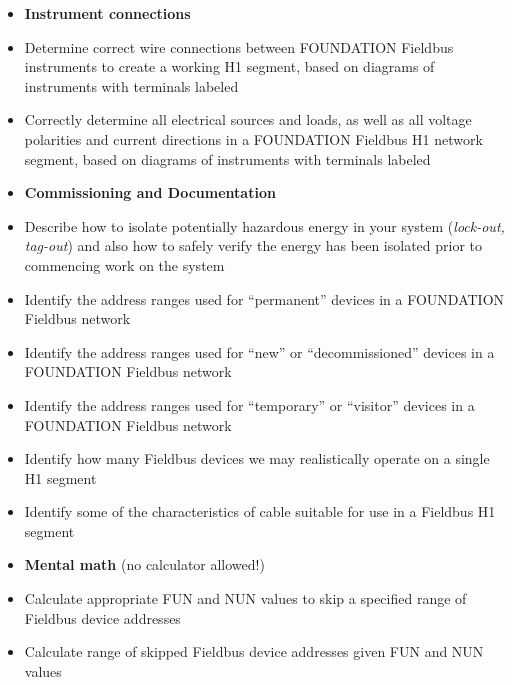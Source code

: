 \begin{itemize}
\item{} {\bf Instrument connections}
\item{} Determine correct wire connections between FOUNDATION Fieldbus instruments to create a working H1 segment, based on diagrams of instruments with terminals labeled
\item{} Correctly determine all electrical sources and loads, as well as all voltage polarities and current directions in a FOUNDATION Fieldbus H1 network segment, based on diagrams of instruments with terminals labeled
\end{itemize}

\filbreak

\begin{itemize}
\item{} {\bf Commissioning and Documentation}
\item{} Describe how to isolate potentially hazardous energy in your system ({\it lock-out, tag-out}) and also how to safely verify the energy has been isolated prior to commencing work on the system
\item{} Identify the address ranges used for ``permanent'' devices in a FOUNDATION Fieldbus network
\item{} Identify the address ranges used for ``new'' or ``decommissioned'' devices in a FOUNDATION Fieldbus network
\item{} Identify the address ranges used for ``temporary'' or ``visitor'' devices in a FOUNDATION Fieldbus network
\item{} Identify how many Fieldbus devices we may realistically operate on a single H1 segment
\item{} Identify some of the characteristics of cable suitable for use in a Fieldbus H1 segment
\end{itemize}

\filbreak

\begin{itemize}
\item{} {\bf Mental math} (no calculator allowed!)
\item{} Calculate appropriate FUN and NUN values to skip a specified range of Fieldbus device addresses
\item{} Calculate range of skipped Fieldbus device addresses given FUN and NUN values
\end{itemize}

\filbreak

